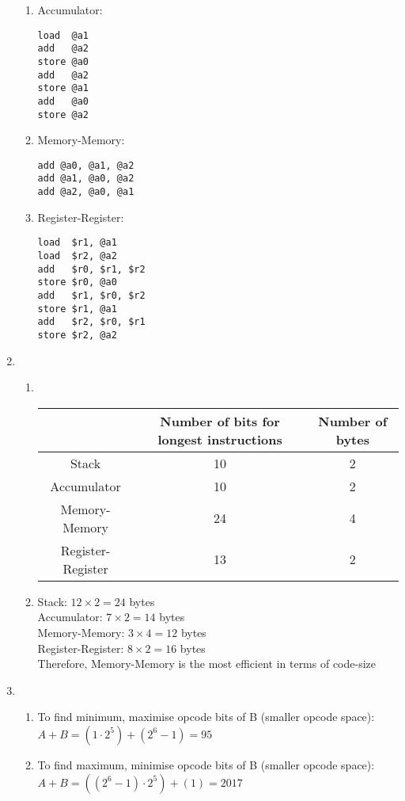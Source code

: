 \documentclass[12pt, a4paper]{article}
\begin{document}
\begin{enumerate}[Q\arabic*.]
\begin{enumerate}[(\alph*.)]
      \item Accumulator:
        \begin{lstlisting}
load  @a1
add   @a2
store @a0
add   @a2
store @a1
add   @a0
store @a2
        \end{lstlisting}

      \item Memory-Memory:
        \begin{lstlisting}
add @a0, @a1, @a2
add @a1, @a0, @a2
add @a2, @a0, @a1
        \end{lstlisting}

      \item Register-Register:
        \begin{lstlisting}
load  $r1, @a1
load  $r2, @a2
add   $r0, $r1, $r2
store $r0, @a0
add   $r1, $r0, $r2
store $r1, @a1
add   $r2, $r0, $r1
store $r2, @a2
        \end{lstlisting}
    \end{enumerate}
    \pagebreak

  \item 
    \begin{enumerate}[(\alph*.)]
      \item \hspace{1em}\\
        \begin{tabular}{|c|c|c|}
          \hline
              & Number of bits for longest instructions & Number of bytes \\
          \hline
          Stack & 10 & 2\\
          \hline
          Accumulator & 10 & 2\\
          \hline
          Memory-Memory & 24 & 4\\
          \hline
          Register-Register & 13 & 2\\
          \hline
        \end{tabular}


      \item Stack: $12 \times 2 = 24$ bytes\\
        Accumulator: $7 \times 2 = 14$ bytes\\
        Memory-Memory: $3 \times 4 = 12$ bytes\\
        Register-Register: $8 \times 2 = 16$ bytes\\
        Therefore, Memory-Memory is the most efficient in terms of code-size
    \end{enumerate}
  
  \item 
    \begin{enumerate}[(\alph*.)]
      \item To find minimum, maximise opcode bits of B (smaller opcode space): $A + B = (1\cdot 2^5) + (2^6-1) = 95$
      \item To find maximum, minimise opcode bits of B (smaller opcode space): $A + B = ((2^6-1)\cdot 2^5) + (1) = 2017$
    \end{enumerate}
\end{enumerate}
\end{document}
